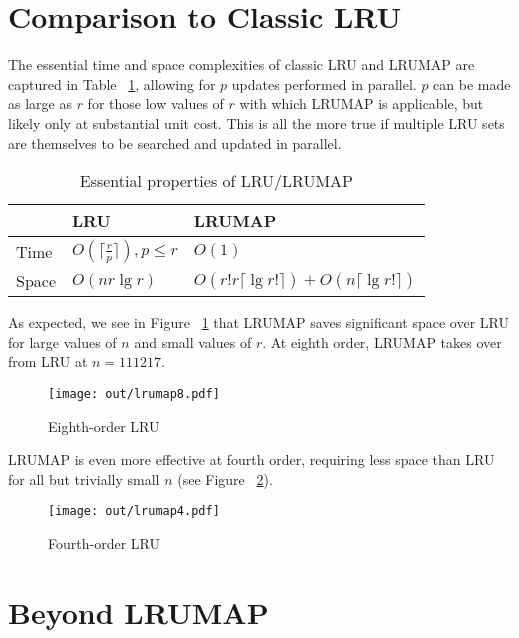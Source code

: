 \documentclass[10pt]{sigplanconf}
\begin{document}
\section{Comparison to Classic LRU}
The essential time and space complexities of classic LRU and LRUMAP are
captured in Table ~\ref{tab:lru}, allowing for $p$ updates performed in
parallel. $p$ can be made as large as $r$ for those low values of $r$ with
which LRUMAP is applicable, but likely only at substantial unit cost. This is
all the more true if multiple LRU sets are themselves to be searched and
updated in parallel.

\begin{table}[h]
\begin{center}
	\begin{tabular}{|l|l|l|}
	\hline
	& LRU & LRUMAP \\
	\hline
	Time & $O(\lceil\frac{r}{p}\rceil), {p}\le{r}$ & $O(1)$ \\
	\hline
	Space & $O(nr\lg{r})$ & $O(r!r\lceil\lg{r!}\rceil) + O(n\lceil\lg{r!}\rceil)$ \\
	\hline
	\end{tabular}
	\caption{Essential properties of LRU/LRUMAP}
\label{tab:lru}
\end{center}
\end{table}

As expected, we see in Figure ~\ref{fig:lru8} that LRUMAP saves significant space over LRU for large
values of $n$ and small values of $r$. At eighth order, LRUMAP takes over
from LRU at $n=111217$.

\begin{figure}[h]
\begin{center}
	\texttt{[image: out/lrumap8.pdf]}
	\caption{Eighth-order LRU}
\label{fig:lru8}
\end{center}
\end{figure}

LRUMAP is even more effective at fourth order, requiring less space than LRU
for all but trivially small $n$ (see Figure ~\ref{fig:lru4}).

\begin{figure}[h]
\begin{center}
	\texttt{[image: out/lrumap4.pdf]}
	\caption{Fourth-order LRU}
\label{fig:lru4}
\end{center}
\end{figure}

\section{Beyond LRUMAP}
\end{document}
